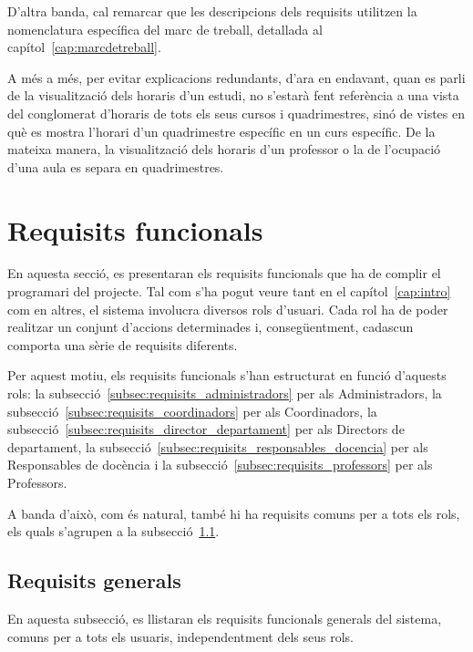 \documentclass[a4paper,12pt]{ThesisStyle}
\begin{document}
D'altra banda, cal remarcar que les descripcions dels requisits utilitzen la nomenclatura específica del marc de treball, detallada al capítol~\ref{cap:marcdetreball}.

A més a més, per evitar explicacions redundants, d'ara en endavant, quan es parli de la visualització dels horaris d'un estudi, no s'estarà fent referència a una vista del conglomerat d'horaris de tots els seus cursos i quadrimestres, sinó de vistes en què es mostra l'horari d'un quadrimestre específic en un curs específic. De la mateixa manera, la visualització dels horaris d'un professor o la de l'ocupació d'una aula es separa en quadrimestres.

\section{Requisits funcionals}
\label{sec:requisits_funcionals}

En aquesta secció, es presentaran els requisits funcionals que ha de complir el programari del projecte. Tal com s'ha pogut veure tant en el capítol~\ref{cap:intro} com en altres, el sistema involucra diversos rols d'usuari. Cada rol ha de poder realitzar un conjunt d'accions determinades i, consegüentment, cadascun comporta una sèrie de requisits diferents.

Per aquest motiu, els requisits funcionals s'han estructurat en funció d'aquests rols: la subsecció~\ref{subsec:requisits_administradors} per als Administradors, la subsecció~\ref{subsec:requisits_coordinadors} per als Coordinadors, la subsecció~\ref{subsec:requisits_director_departament} per als Directors de departament, la subsecció~\ref{subsec:requisits_responsables_docencia} per als Responsables de docència i la subsecció~\ref{subsec:requisits_professors} per als Professors.

A banda d'això, com és natural, també hi ha requisits comuns per a tots els rols, els quals s'agrupen a la subsecció~\ref{subsec:requisits_generals}.

\subsection{Requisits generals}
\label{subsec:requisits_generals}

En aquesta subsecció, es llistaran els requisits funcionals generals del sistema, comuns per a tots els usuaris, independentment dels seus rols.
\end{document}
